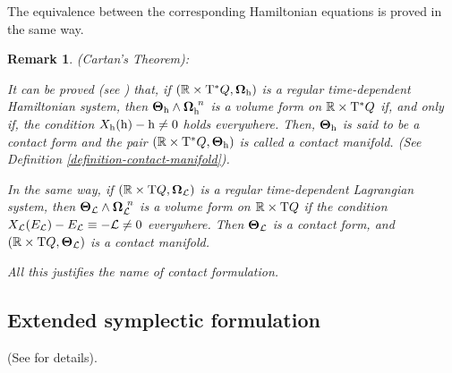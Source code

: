 \documentclass[12pt]{report}
\newtheorem{remark}[teor]{Remark}
\def\Lag{{\cal L}}
\def\Real{\mathbb{R}}
\def\Tan{{\rm T}}
\begin{document}
The equivalence between the corresponding Hamiltonian equations is proved in the same way.

\begin{remark}
({\sl Cartan's Theorem\/}): {\rm
It can be proved (see \cite{AM-78}) that, if $(\Real\times\Tan^*Q,\mbox{\boldmath $\Omega$}_{\rm h})$
is a regular time-dependent Hamiltonian system, then
$\mbox{\boldmath $\Theta$}_{\rm h}\wedge\mbox{\boldmath $\Omega$}_{\rm h}^{\ n}$ is a volume form on $\Real\times\Tan^*Q$ 
if, and only if, the condition $X_{\rm h}({\rm h})-{\rm h}\not=0$ holds everywhere.
Then, $\mbox{\boldmath $\Theta$}_{\rm h}$ is said to be a {\sl contact form} and the pair $(\Real\times\Tan^*Q,\mbox{\boldmath $\Theta$}_{\rm h})$  is called a {\sl contact manifold}.
(See Definition \ref{definition-contact-manifold}).

In the same way, if $(\Real\times\Tan Q,\mbox{\boldmath $\Omega$}_\Lag)$ is a regular time-dependent Lagrangian system,
then $\mbox{\boldmath $\Theta$}_\Lag\wedge\mbox{\boldmath $\Omega$}_\Lag^{\ n}$ is a volume form on $\Real\times\Tan Q$
if the condition $X_\Lag(E_\Lag)-E_\Lag\equiv-\Lag\not=0$ everywhere.
Then $\mbox{\boldmath $\Theta$}_\Lag$ is a contact form, and $(\Real\times\Tan Q,\mbox{\boldmath $\Theta$}_\Lag)$ is a contact manifold.

All this justifies the name of {\sl contact formulation}.
\label{Cartan}
}\end{remark}


\subsection{Extended symplectic formulation}


(See \cite{ACI-gct,EMR-gstds,Ku-td,Ra2,Ra1} for details).
\end{document}
